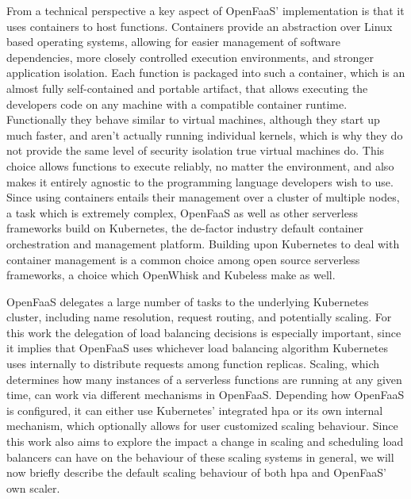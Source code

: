 From a technical perspective a key aspect of OpenFaaS' implementation is that it uses containers to host functions.
Containers provide an abstraction over Linux based operating systems, allowing for easier management of software dependencies, more closely controlled execution environments, and stronger application isolation.
Each function is packaged into such a container, which is an almost fully self-contained and portable artifact, that allows executing the developers code on any machine with a compatible container runtime.
Functionally they behave similar to virtual machines, although they start up much faster, and aren't actually running individual kernels, which is why they do not provide the same level of security isolation true virtual machines do.
This choice allows functions to execute reliably, no matter the environment, and also makes it entirely agnostic to the programming language developers wish to use.
Since using containers entails their management over a cluster of multiple nodes, a task which is extremely complex, OpenFaaS\cite{openfaas} as well as other serverless frameworks build on Kubernetes\cite{kubernetes}, the de-factor industry default container orchestration and management platform.
Building upon Kubernetes to deal with container management is a common choice among open source serverless frameworks, a choice which OpenWhisk and Kubeless make as well\cite{mohantyEvaluationOpenSource2018}.

OpenFaaS delegates a large number of tasks to the underlying Kubernetes cluster, including name resolution, request routing, and potentially scaling.
For this work the delegation of load balancing decisions is especially important, since it implies that OpenFaaS uses whichever load balancing algorithm Kubernetes uses internally to distribute requests among function replicas.
Scaling, which determines how many instances of a serverless functions are running at any given time, can work via different mechanisms in OpenFaaS.
Depending how OpenFaaS is configured, it can either use Kubernetes' integrated \gls{hpa}\cite{kubernetes-hpa} or its own internal mechanism, which optionally allows for user customized scaling behaviour\cite{openfaas-autoscaling}.
Since this work also aims to explore the impact a change in scaling and scheduling load balancers can have on the behaviour of these scaling systems in general, we will now briefly describe the default scaling behaviour of both \gls{hpa} and OpenFaaS' own scaler.

